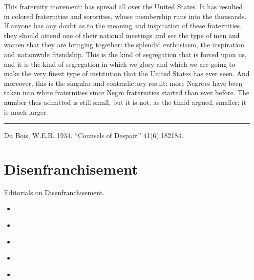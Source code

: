 \documentclass[letterpaper,10pt,english]{jupyterBook}
\begin{document}
\sphinxAtStartPar
This fraternity movement: has spread all over the United States. It has resulted in colored fraternities and sororities, whose membership runs into the thousands. If anyone has any doubt as to the meaning and inspiration of these fraternities, they should attend one of their national meetings and see the type of men and women that they are bringing together: the splendid enthusiasm, the inspiration and nationwide friendship. This is the kind of segregation that is forced upon us, and it is the kind of segregation in which we glory and which we are going to make the very finest type of institution that the United States has ever seen. And moreover, this is the singular and contradictory result: more Negroes have been taken into white fraternities since Negro fraternities started than ever before. The number thus admitted is still small, but it is not, as the timid argued, smaller; it is much larger.


\bigskip\hrule\bigskip


\sphinxAtStartPar
{} Du Bois, W.E.B. 1934. “Counsels of Despair.”   41(6):182\sphinxhyphen{}184.


\section{Disenfranchisement}
\label{\detokenize{Sections/voting:disenfranchisement}}\label{\detokenize{Sections/voting::doc}}
\sphinxAtStartPar
Editorials on Disenfranchisement.
\begin{itemize}
\item {} 
\sphinxAtStartPar
{\hyperref[\detokenize{Volumes/30/02/disenfranchisement::doc}]{}}

\item {} 
\sphinxAtStartPar
{\hyperref[\detokenize{Volumes/36/05/negro_citizen::doc}]{}}

\item {} 
\sphinxAtStartPar
{\hyperref[\detokenize{Volumes/36/11/negro_in_politics::doc}]{}}

\item {} 
\sphinxAtStartPar
{\hyperref[\detokenize{Volumes/39/09/young_voters::doc}]{}}

\item {} 
\sphinxAtStartPar
{\hyperref[\detokenize{Volumes/40/06/strategy_of_the_negro_voter::doc}]{}}

\end{itemize}
\end{document}
